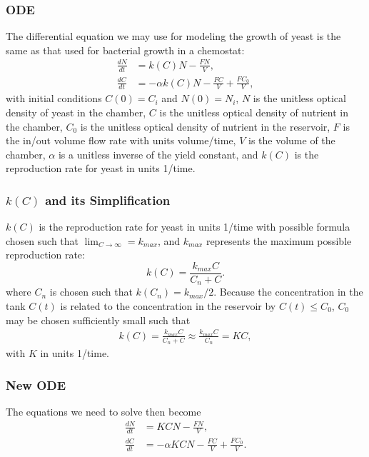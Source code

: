 \documentclass{beamer}
\begin{document}
\begin{frame}
  \frametitle{ODE}
  The differential equation we may use for modeling the growth of yeast is the same as that used for bacterial growth in a chemostat:
  \begin{align*}
    \frac{dN}{dt} &= k(C) N - \frac{FN}{V}, \\
    \frac{dC}{dt} &= -\alpha k(C) N - \frac{FC}{V} + \frac{FC_0}{V},
  \end{align*}
  with initial conditions $C(0) = C_i$ and $N(0) = N_i$, $N$ is the unitless optical density of yeast in the chamber, $C$ is the unitless optical density of nutrient in the chamber, $C_0$ is the unitless optical density of nutrient in the reservoir, $F$ is the in/out volume flow rate with units volume/time, $V$ is the volume of the chamber, $\alpha$ is a unitless inverse of the yield constant, and $k(C)$ is the reproduction rate for yeast in units 1/time.
\end{frame}

\begin{frame}
  \frametitle{$k(C)$ and its Simplification}
  $k(C)$ is the reproduction rate for yeast in units 1/time with possible formula chosen such that $\lim_{C \rightarrow \infty} = k_{max}$, and $k_{max}$ represents the maximum possible reproduction rate:
  $$k(C) = \frac{k_{max} C}{C_n + C}.$$
  where $C_n$ is chosen such that $k(C_n) = k_{max} / 2$.  Because the concentration in the tank $C(t)$ is related to the concentration in the reservoir by $C(t) \leq C_0$, $C_0$ may be chosen sufficiently small such that 
  \begin{align*}
    k(C) = \frac{k_{max} C}{C_n + C} \approx \frac{k_{max} C}{C_n} = KC,
  \end{align*}
  with $K$ in units 1/time.
\end{frame}

\begin{frame}
  \frametitle{New ODE}
  The equations we need to solve then become 
  \begin{align}
    \frac{dN}{dt} &= KCN - \frac{FN}{V}, \\
    \frac{dC}{dt} &= -\alpha KCN - \frac{FC}{V} + \frac{FC_0}{V}.
  \end{align}
\end{frame}
\end{document}

